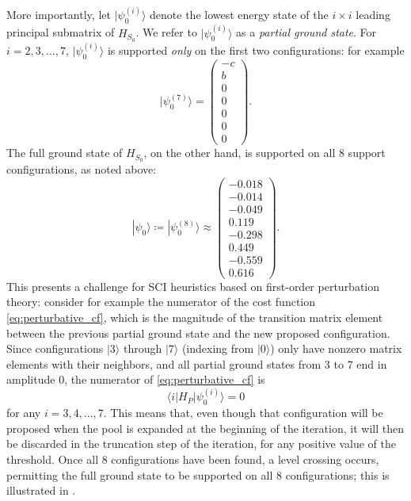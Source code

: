 \documentclass[
  reprint,            %
  amsmath,amssymb,
  aps,
  superscriptaddress, %
  longbibliography
]{revtex4-2}
\theoremstyle{definition}
\begin{document}
More importantly, let $|\psi^{(i)}_0\rangle$ denote the lowest energy state of the $i\times i$ leading principal submatrix of $H_{S_0}$.
We refer to $|\psi^{(i)}_0\rangle$ as a \emph{partial ground state}.
For ${i=2,3,...,7}$, $|\psi^{(i)}_0\rangle$ is supported \emph{only} on the first two configurations: for example
\begin{equation}
    |\psi^{(7)}_0\rangle=\begin{pmatrix}-c\\b\\0\\0\\0\\0\\0\end{pmatrix}.
\end{equation}
The full ground state of $H_{S_0}$, on the other hand, is supported on all $8$ support configurations, as noted above:
\begin{equation}
    |\psi_0\rangle \coloneqq |\psi^{(8)}_0\rangle
    \approx \begin{pmatrix}
        -0.018 \\
        -0.014 \\
        -0.049 \\
        0.119 \\
        -0.298 \\
        0.449 \\
        -0.559 \\
        0.616
    \end{pmatrix}.
\end{equation}
This presents a challenge for SCI heuristics based on first-order perturbation theory: consider for example the numerator of the cost function \eqref{eq:perturbative_cf}, which is the magnitude of the transition matrix element between the previous partial ground state and the new proposed configuration.
Since configurations $|3\rangle$ through $|7\rangle$ (indexing from $|0\rangle$) only have nonzero matrix elements with their neighbors, and all partial ground states from $3$ to $7$ end in amplitude $0$, the numerator of \eqref{eq:perturbative_cf} is
\begin{equation}
    \langle i| H_P |\psi^{(i)}_0\rangle = 0
\end{equation}
for any $i=3,4,...,7$.
This means that, even though that configuration will be proposed when the pool is expanded at the beginning of the iteration, it will then be discarded in the truncation step of the iteration, for any positive value of the threshold.
Once all $8$ configurations have been found, a level crossing occurs, permitting the full ground state to be supported on all $8$ configurations; this is illustrated in .
\end{document}
